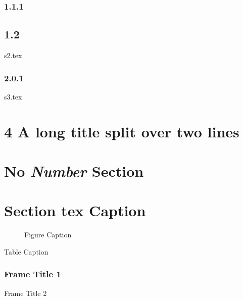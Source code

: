 \documentclass{article}
\begin{document}

\label{sec11}
\subsubsection{1.1.1}
\subsection{1.2}
{s2.tex}
\subsubsection{2.0.1}
{s3.tex}
\section{4 A long title split
over two lines}
\section*{No \textit{Number} Section}
\section{Section \texorpdfstring{tex}{pdf} Caption}
\begin{figure}
\end{figure}
\begin{figure}
\caption{Figure Caption}
\end{figure}
\begin{table}
\caption{Table Caption}
\end{table}
\begin{frame}
\frametitle{Frame Title 1}
\end{frame}
\begin{frame} {Frame Title 2}
\end{frame}
\begin{frame}
\end{frame}
\end{document}
